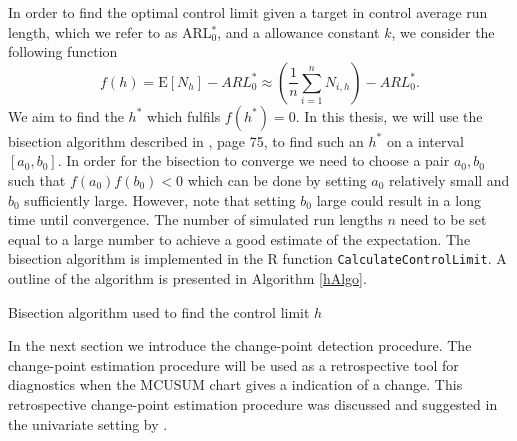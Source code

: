 In order to find the optimal control limit given a target in control average run length, which we refer to as ARL$^*_0$, and a allowance constant $k$, we consider the following function
\begin{equation}\label{FUN}
f(h)=\text{E}[N_h]-ARL^*_0 \approx \left(\frac{1}{n}\sum_{i=1}^{n} N_{i,h}\right)-ARL^*_0.
\end{equation}
We aim to find the $h^*$ which fulfils $f(h^*)=0$. In this thesis, we will use the bisection algorithm described in \citet{NumAnalysis}, page 75, to find such an $h^*$ on a interval $[a_0,b_0]$. In order for the bisection to converge we need to choose a pair $a_0,b_0$ such that $f(a_0)f(b_0)<0$ which can be done by setting $a_0$ relatively small and $b_0$ sufficiently large. However, note that setting $b_0$ large could result in a long time until convergence. The number of simulated run lengths $n$ need to be set equal to a large number to achieve a good estimate of the expectation. The bisection algorithm is implemented in the R function \texttt{CalculateControlLimit}. A outline of the algorithm is presented in Algorithm \ref{hAlgo}. 
\begin{algorithm}
\caption{Bisection algorithm used to find the control limit $h$\label{hAlgo}}
\BlankLine
\end{algorithm}

In the next section we introduce the change-point detection procedure. The change-point estimation procedure will be used as a retrospective tool for diagnostics when the MCUSUM chart gives a indication of a change. This retrospective change-point estimation procedure was discussed and suggested in the univariate setting by \citet{pignatiello2001estimation}.


